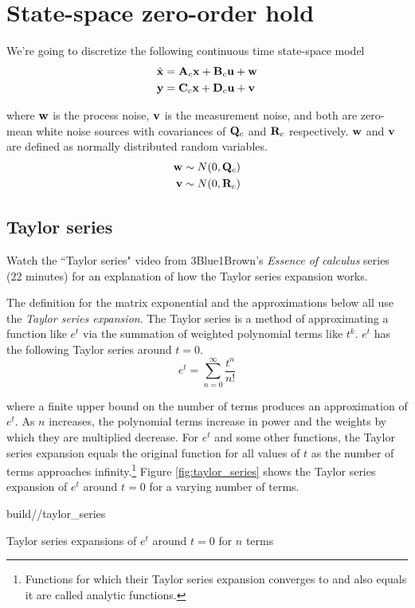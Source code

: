 \section{State-space zero-order hold}

We're going to discretize the following continuous time state-space model
\begin{align*}
  \dot{\mathbf{x}} &= \mathbf{A}_c\mathbf{x} + \mathbf{B}_c\mathbf{u} + \mathbf{w} \\
  \mathbf{y} &= \mathbf{C}_c\mathbf{x} + \mathbf{D}_c\mathbf{u} + \mathbf{v}
\end{align*}

where $\mathbf{w}$ is the process noise, $\mathbf{v}$ is the measurement noise, and
both are zero-mean white noise sources with covariances of $\mathbf{Q}_c$ and
$\mathbf{R}_c$ respectively. $\mathbf{w}$ and $\mathbf{v}$ are defined as normally
distributed random variables.
\begin{align*}
  \mathbf{w} &\sim N(0, \mathbf{Q}_c) \\
  \mathbf{v} &\sim N(0, \mathbf{R}_c)
\end{align*}

\subsection{Taylor series}
\begin{remark}
  Watch the ``Taylor series" video from 3Blue1Brown's \textit{Essence of
  calculus} series (22 minutes) \cite{bib:calculus_taylor_series} for an
  explanation of how the Taylor series expansion works.
\end{remark}

The definition for the matrix exponential and the approximations below all use
the \textit{Taylor series expansion}. The Taylor series is a method of
approximating a function like $e^t$ via the summation of weighted polynomial
terms like $t^k$. $e^t$ has the following Taylor series around $t = 0$.
\begin{equation*}
  e^t = \sum_{n = 0}^\infty \frac{t^n}{n!}
\end{equation*}

where a finite upper bound on the number of terms produces an approximation of
$e^t$. As $n$ increases, the polynomial terms increase in power and the weights
by which they are multiplied decrease. For $e^t$ and some other functions, the
Taylor series expansion equals the original function for all values of $t$ as
the number of terms approaches infinity.\footnote{Functions for which their
Taylor series expansion converges to and also equals it are called analytic
functions.} Figure \ref{fig:taylor_series} shows the Taylor series expansion of
$e^t$ around $t = 0$ for a varying number of terms.
\begin{svg}{build/\chapterpath/taylor_series}
  \caption{Taylor series expansions of $e^t$ around $t = 0$ for $n$ terms}
  \label{fig:taylor_series}
\end{svg}

